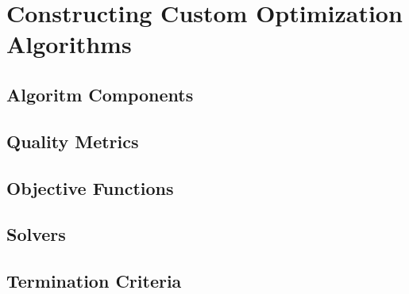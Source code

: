 \chapter{Constructing Custom Optimization Algorithms}

\section{Algoritm Components}




\section{Quality Metrics}

\section{Objective Functions}

\section{Solvers}

\section{Termination Criteria \label{sec:termination}}
